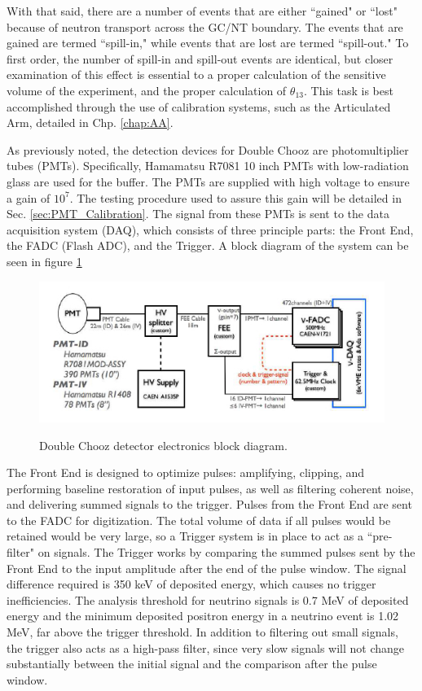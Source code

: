 With that said, there are a number of events that are either ``gained" or ``lost" because of neutron transport across the GC/NT boundary. The events that are gained are termed ``spill-in," while events that are lost are termed ``spill-out." To first order, the number of spill-in and spill-out events are identical, but closer examination of this effect is essential to a proper calculation of the sensitive volume of the experiment, and the proper calculation of $\theta_{13}$.  This task is best accomplished through the use of calibration systems, such as the Articulated Arm, detailed in Chp. \ref{chap:AA}.

As previously noted, the detection devices for Double Chooz are photomultiplier tubes (PMTs). Specifically, Hamamatsu R7081 10 inch PMTs with low-radiation glass are used for the buffer. The PMTs are supplied with high voltage to ensure a gain of $10^7$. The testing procedure used to assure this gain will be detailed in Sec. \ref{sec:PMT_Calibration}. The signal from these PMTs is sent to the data acquisition system (DAQ), which consists of three principle parts: the Front End, the FADC (Flash ADC), and the Trigger. A block diagram of the system can be seen in figure \ref{Block Diagram}

\begin{figure}
\caption{Double Chooz detector electronics  block diagram.}
\centering
\includegraphics[width=.5\textwidth]{DC_Results/DC_Block_Diag.jpg}
\label{Block Diagram}
\end{figure}

The Front End is designed to optimize pulses: amplifying, clipping, and performing baseline restoration of input pulses, as well as filtering coherent noise, and delivering summed signals to the trigger. Pulses from the Front End are sent to the FADC for digitization. The total volume of data if all pulses would be retained would be very large, so a Trigger system is in place to act as a ``pre-filter" on signals. The Trigger works by comparing the summed pulses sent by the Front End to the input amplitude after the end of the pulse window. The signal difference required is 350 keV of deposited energy, which causes no trigger inefficiencies. The analysis threshold for neutrino signals is 0.7 MeV of deposited energy and the minimum deposited positron energy in a neutrino event is 1.02 MeV, far above the trigger threshold.  In addition to filtering out small signals, the trigger also acts as a high-pass filter, since very slow signals will not change substantially between the initial signal and the comparison after the pulse window. 

